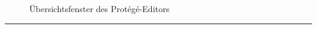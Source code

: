 \begin{figure}[H]
\centering {}
\caption{Übersichtsfenster des Protégé-Editors\label{fig:protege}\protect\footnotemark}
\end{figure}
\noindent\rule[1ex]{\textwidth}{1pt}
